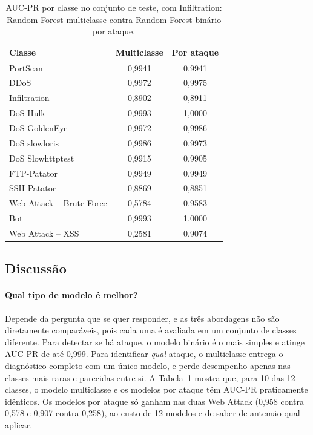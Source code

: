 \begin{table}[ht]
\centering
\caption{AUC-PR por classe no conjunto de teste, com Infiltration: Random Forest multiclasse contra Random Forest binário por ataque.}
\label{tab:porclasse}
\begin{tabular}{lcc}
\toprule
Classe & Multiclasse & Por ataque \\
\midrule
PortScan                 & 0,9941 & 0,9941 \\
DDoS                     & 0,9972 & 0,9975 \\
Infiltration             & 0,8902 & 0,8911 \\
DoS Hulk                 & 0,9993 & 1,0000 \\
DoS GoldenEye            & 0,9972 & 0,9986 \\
DoS slowloris            & 0,9986 & 0,9973 \\
DoS Slowhttptest         & 0,9915 & 0,9905 \\
FTP-Patator              & 0,9949 & 0,9949 \\
SSH-Patator              & 0,8869 & 0,8851 \\
Web Attack -- Brute Force & 0,5784 & 0,9583 \\
Bot                      & 0,9993 & 1,0000 \\
Web Attack -- XSS        & 0,2581 & 0,9074 \\
\bottomrule
\end{tabular}
\end{table}

\subsection{Discussão}

\paragraph{Qual tipo de modelo é melhor?}
Depende da pergunta que se quer responder, e as três abordagens não são diretamente comparáveis, pois cada uma é avaliada em um conjunto de classes diferente. Para detectar se há ataque, o modelo binário é o mais simples e atinge AUC-PR de até 0,999. Para identificar \emph{qual} ataque, o multiclasse entrega o diagnóstico completo com um único modelo, e perde desempenho apenas nas classes mais raras e parecidas entre si. A Tabela~\ref{tab:porclasse} mostra que, para 10 das 12 classes, o modelo multiclasse e os modelos por ataque têm AUC-PR praticamente idênticos. Os modelos por ataque só ganham nas duas Web Attack (0,958 contra 0,578 e 0,907 contra 0,258), ao custo de 12 modelos e de saber de antemão qual aplicar.


